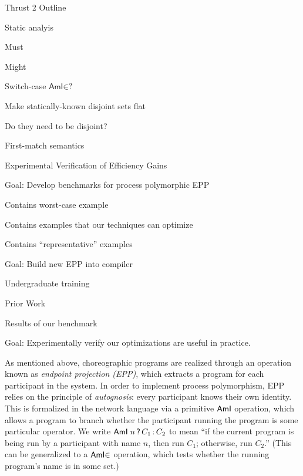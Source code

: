 \begin{outline}{Thrust 2 Outline}
  \begin{lvl}
  \item Static analyis
    \begin{lvl}
    \item Must
    \item Might
    \end{lvl}
  \item Switch-case $\textsf{AmI}\mathord{\in}\textsf{?}$
    \begin{lvl}
    \item Make statically-known disjoint sets flat
    \item Do they need to be disjoint?
      \begin{lvl}
      \item First-match semantics
      \end{lvl}
    \end{lvl}
  \end{lvl}
\item Experimental Verification of Efficiency Gains
  \begin{lvl}
  \item Goal: Develop benchmarks for process polymorphic EPP
    \begin{lvl}
    \item Contains worst-case example
    \item Contains examples that our techniques can optimize
    \item Contains ``representative'' examples
    \end{lvl}
  \item Goal: Build new EPP into compiler
    \begin{lvl}
    \item Undergraduate training
    \item Prior Work
    \end{lvl}
  \item Results of our benchmark
    \begin{lvl}
    \item Goal: Experimentally verify our optimizations are useful in practice.
    \end{lvl}
  \end{lvl}
\end{outline}
\fi

As mentioned above, choreographic programs are realized through an operation known as \emph{endpoint projection (EPP)}, which extracts a program for each participant in the system.
In order to implement process polymorphism, EPP relies on the principle of \emph{autognosis}: every participant knows their own identity.
This is formalized in the network language via a primitive $\textsf{AmI}$ operation, which allows a program to branch whether the participant running the program is some particular operator.
We write $\textsf{AmI}\mkern5mun \mathop{\textsf{?}} C_1 \mathop{\textsf{:}} C_2$ to mean ``if the current program is being run by a participant with name $n$, then run $C_1$; otherwise, run $C_2$.''
(This can be generalized to a $\textsf{AmI}\mathord{\in}$ operation, which tests whether the running program's name is in some set.)

